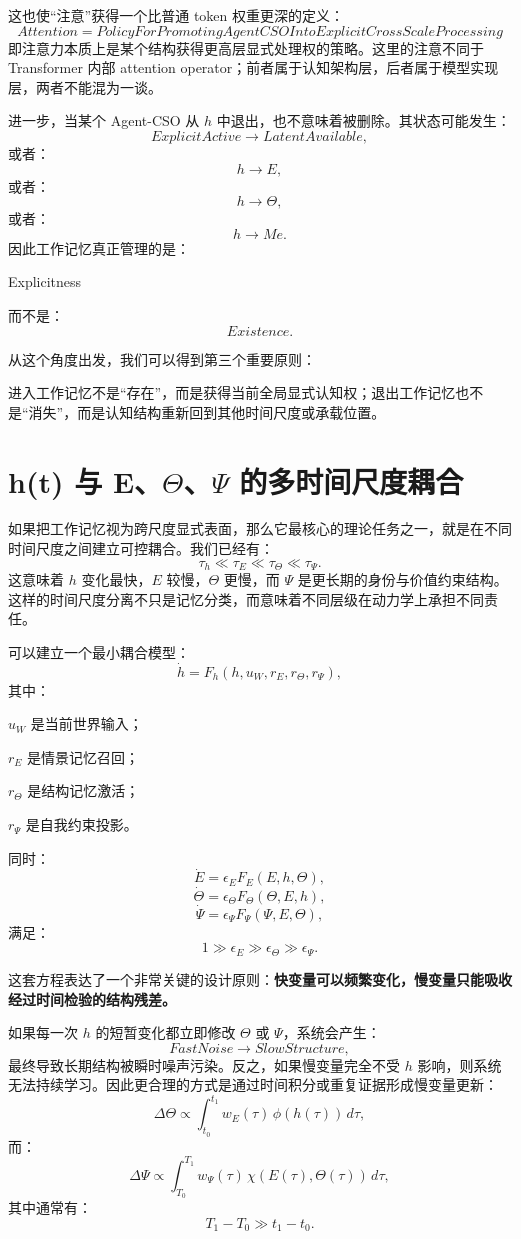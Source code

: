 这也使“注意”获得一个比普通 token 权重更深的定义：
\[
\boxed{
Attention
=
PolicyForPromotingAgentCSOIntoExplicitCrossScaleProcessing
}
\]
即注意力本质上是某个结构获得更高层显式处理权的策略。这里的注意不同于 Transformer 内部 attention operator；前者属于认知架构层，后者属于模型实现层，两者不能混为一谈。

进一步，当某个 Agent-CSO 从 $h$ 中退出，也不意味着被删除。其状态可能发生：
\[
ExplicitActive
\rightarrow
LatentAvailable,
\]
或者：
\[
h\rightarrow E,
\]
或者：
\[
h\rightarrow\Theta,
\]
或者：
\[
h\rightarrow Me.
\]
因此工作记忆真正管理的是：
\begin{statementbox}
Explicitness
\end{statementbox}
而不是：
\[
Existence.
\]

从这个角度出发，我们可以得到第三个重要原则：
\begin{proposition*}
进入工作记忆不是“存在”，而是获得当前全局显式认知权；退出工作记忆也不是“消失”，而是认知结构重新回到其他时间尺度或承载位置。
\end{proposition*}

\section{h(t) 与 E、$\Theta$、$\Psi$ 的多时间尺度耦合}

如果把工作记忆视为跨尺度显式表面，那么它最核心的理论任务之一，就是在不同时间尺度之间建立可控耦合。我们已经有：
\[
\tau_h
\ll
\tau_E
\ll
\tau_\Theta
\ll
\tau_\Psi.
\]
这意味着 $h$ 变化最快，$E$ 较慢，$\Theta$ 更慢，而 $\Psi$ 是更长期的身份与价值约束结构。这样的时间尺度分离不只是记忆分类，而意味着不同层级在动力学上承担不同责任。

可以建立一个最小耦合模型：
\[
\dot h
=
F_h
\left(
h,
u_W,
r_E,
r_\Theta,
r_\Psi
\right),
\]
其中：

$u_W$ 是当前世界输入；

$r_E$ 是情景记忆召回；

$r_\Theta$ 是结构记忆激活；

$r_\Psi$ 是自我约束投影。

同时：
\[
\dot E
=
\epsilon_E
F_E(E,h,\Theta),
\]
\[
\dot\Theta
=
\epsilon_\Theta
F_\Theta(\Theta,E,h),
\]
\[
\dot\Psi
=
\epsilon_\Psi
F_\Psi(\Psi,E,\Theta),
\]
满足：
\[
1
\gg
\epsilon_E
\gg
\epsilon_\Theta
\gg
\epsilon_\Psi.
\]

这套方程表达了一个非常关键的设计原则：\textbf{快变量可以频繁变化，慢变量只能吸收经过时间检验的结构残差。}

如果每一次 $h$ 的短暂变化都立即修改 $\Theta$ 或 $\Psi$，系统会产生：
\[
FastNoise
\rightarrow
SlowStructure,
\]
最终导致长期结构被瞬时噪声污染。反之，如果慢变量完全不受 $h$ 影响，则系统无法持续学习。因此更合理的方式是通过时间积分或重复证据形成慢变量更新：
\[
\Delta\Theta
\propto
\int_{t_0}^{t_1}
w_E(\tau)\,
\phi(h(\tau))
\,d\tau,
\]
而：
\[
\Delta\Psi
\propto
\int_{T_0}^{T_1}
w_\Psi(\tau)
\,
\chi(E(\tau),\Theta(\tau))
\,d\tau,
\]
其中通常有：
\[
T_1-T_0
\gg
t_1-t_0.
\]

